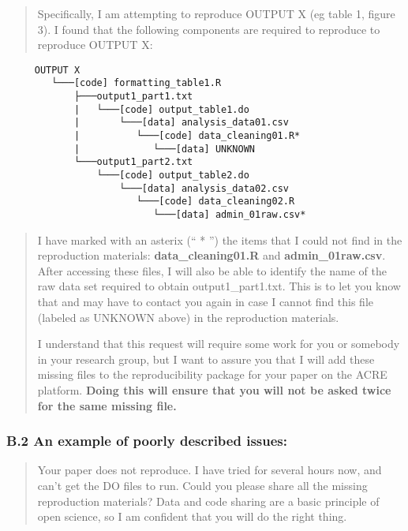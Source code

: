 \documentclass[]{book}
\begin{document}
\begin{quote}
Specifically, I am attempting to reproduce OUTPUT X (eg table 1, figure 3). I found that the following components are required to reproduce to reproduce OUTPUT X:
\end{quote}

\begin{verbatim}
     OUTPUT X
        └───[code] formatting_table1.R
            ├───output1_part1.txt  
            |   └───[code] output_table1.do           
            |       └───[data] analysis_data01.csv
            |          └───[code] data_cleaning01.R*
            |             └───[data] UNKNOWN
            └───output1_part2.txt  
                └───[code] output_table2.do           
                    └───[data] analysis_data02.csv
                       └───[code] data_cleaning02.R
                          └───[data] admin_01raw.csv* 
\end{verbatim}

\begin{quote}
I have marked with an asterix (`` * '') the items that I could not find in the reproduction materials: \textbf{data\_cleaning01.R} and \textbf{admin\_01raw.csv}. After accessing these files, I will also be able to identify the name of the raw data set required to obtain output1\_part1.txt. This is to let you know that and may have to contact you again in case I cannot find this file (labeled as UNKNOWN above) in the reproduction materials.

I understand that this request will require some work for you or somebody in your research group, but I want to assure you that I will add these missing files to the reproducibility package for your paper on the ACRE platform. \textbf{Doing this will ensure that you will not be asked twice for the same missing file.}
\end{quote}

\hypertarget{b.2-an-example-of-poorly-described-issues}{%
\subsubsection{B.2 An example of poorly described issues:}\label{b.2-an-example-of-poorly-described-issues}}

\begin{quote}
Your paper does not reproduce. I have tried for several hours now, and can't get the DO files to run. Could you please share all the missing reproduction materials? Data and code sharing are a basic principle of open science, so I am confident that you will do the right thing.
\end{quote}
\end{document}
